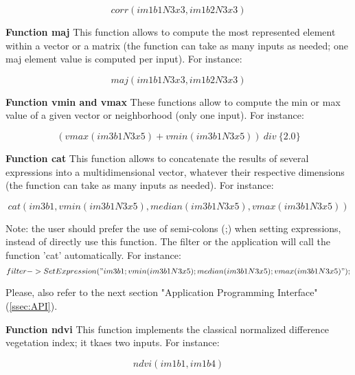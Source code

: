 \begin{equation}
	corr(im1b1N3x3,im1b2N3x3)
\end{equation}

\textbf{Function maj} \newline
This function allows to compute the most represented element within a vector or a matrix (the function can take
as many inputs as needed; one maj element value is computed per input). For instance:

\begin{equation}
	maj(im1b1N3x3,im1b2N3x3)
\end{equation}

\textbf{Function vmin and vmax} \newline
These functions allow to compute the min or max value of a given vector or neighborhood (only one input). For instance:

\begin{equation}
	(vmax(im3b1N3x5)+vmin(im3b1N3x5)) ~ div ~ \{2.0\}
\end{equation}

\textbf{Function cat} \newline
This function allows to concatenate the results of several expressions into a multidimensional vector, whatever their respective dimensions (the function can take
as many inputs as needed). For instance:

\begin{equation}
	cat(im3b1,vmin(im3b1N3x5),median(im3b1N3x5),vmax(im3b1N3x5))
\end{equation}

Note: the user should prefer the use of semi-colons (;) when setting expressions, instead of directly use this function.
The filter or the application will call the function 'cat' automatically. For instance:
\begin{equation}
	filter->SetExpression("im3b1 ; vmin(im3b1N3x5) ; median(im3b1N3x5) ; vmax(im3b1N3x5)");
\end{equation} 

Please, also refer to the next section "Application Programming Interface" (\ref{ssec:API}).

\textbf{Function ndvi} \newline
This function implements the classical normalized difference vegetation index; it tkaes two inputs. For instance:

\begin{equation}
	ndvi(im1b1,im1b4)
\end{equation}

